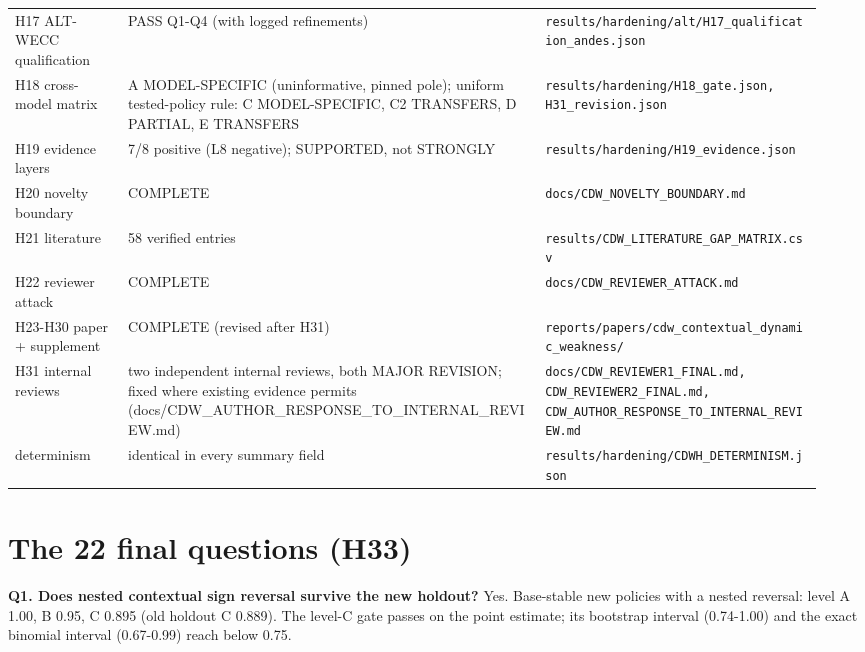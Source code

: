 \documentclass[10pt,a4paper]{article}
\begin{document}
{\begin{longtable}{L{0.130\linewidth}L{0.482\linewidth}L{0.328\linewidth}}
H17 ALT-WECC qualification & PASS Q1-Q4 (with logged refinements) & \texttt{results/\allowbreak{}hardening/\allowbreak{}alt/\allowbreak{}H17\_\allowbreak{}qualification\_\allowbreak{}andes.json} \\
H18 cross-model matrix & A MODEL-SPECIFIC (uninformative, pinned pole); uniform tested-policy rule: C MODEL-SPECIFIC, C2 TRANSFERS, D PARTIAL, E TRANSFERS & \texttt{results/\allowbreak{}hardening/\allowbreak{}H18\_\allowbreak{}gate.json, H31\_\allowbreak{}revision.json} \\
H19 evidence layers & 7/8 positive (L8 negative); SUPPORTED, not STRONGLY & \texttt{results/\allowbreak{}hardening/\allowbreak{}H19\_\allowbreak{}evidence.json} \\
H20 novelty boundary & COMPLETE & \texttt{docs/\allowbreak{}CDW\_\allowbreak{}NOVELTY\_\allowbreak{}BOUNDARY.md} \\
H21 literature & 58 verified entries & \texttt{results/\allowbreak{}CDW\_\allowbreak{}LITERATURE\_\allowbreak{}GAP\_\allowbreak{}MATRIX.csv} \\
H22 reviewer attack & COMPLETE & \texttt{docs/\allowbreak{}CDW\_\allowbreak{}REVIEWER\_\allowbreak{}ATTACK.md} \\
H23-H30 paper + supplement & COMPLETE (revised after H31) & \texttt{reports/\allowbreak{}papers/\allowbreak{}cdw\_\allowbreak{}contextual\_\allowbreak{}dynamic\_\allowbreak{}weakness/\allowbreak{}} \\
H31 internal reviews & two independent internal reviews, both MAJOR REVISION; fixed where existing evidence permits (docs/CDW\_AUTHOR\_RESPONSE\_TO\_INTERNAL\_REVIEW.md) & \texttt{docs/\allowbreak{}CDW\_\allowbreak{}REVIEWER1\_\allowbreak{}FINAL.md, CDW\_\allowbreak{}REVIEWER2\_\allowbreak{}FINAL.md, CDW\_\allowbreak{}AUTHOR\_\allowbreak{}RESPONSE\_\allowbreak{}TO\_\allowbreak{}INTERNAL\_\allowbreak{}REVIEW.md} \\
determinism & identical in every summary field & \texttt{results/\allowbreak{}hardening/\allowbreak{}CDWH\_\allowbreak{}DETERMINISM.json} \\
\bottomrule
\end{longtable}}
\section{The 22 final questions (H33)}
\textbf{Q1. Does nested contextual sign reversal survive the new holdout?} Yes. Base-stable new policies with a nested reversal: level A 1.00, B 0.95, C 0.895 (old holdout C 0.889). The level-C gate passes on the point estimate; its bootstrap interval (0.74-1.00) and the exact binomial interval (0.67-0.99) reach below 0.75.
\end{document}
